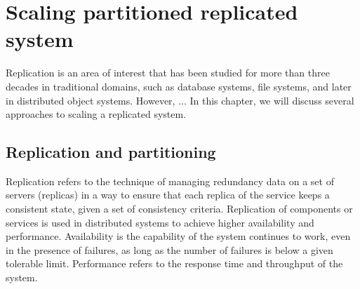 \chapter[Scaling partitioned replicated system]{Scaling partitioned replicated system}

Replication is an area of interest that has been studied for more than three
decades in traditional domains, such as database systems, file systems, and
later in distributed object systems. However, ...
In this chapter, we will discuss several approaches to scaling a replicated system.

\section{Replication and partitioning}

Replication refers to the technique of managing redundancy data on a set of
servers (replicas) in a way to ensure that each replica of the service keeps a
consistent state, given a set of consistency criteria. Replication of components
or services is used in distributed systems to achieve higher availability and
performance. Availability is the capability of the system continues to work,
even in the presence of failures, as long as the number of failures is below a
given tolerable limit. Performance refers to the response time and throughput of
the system.

